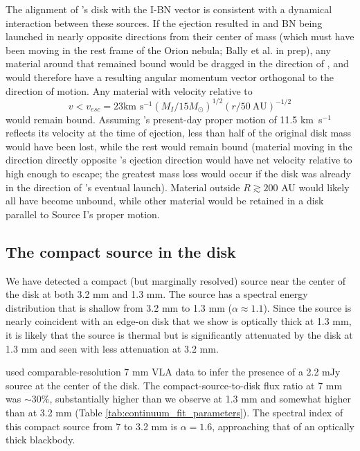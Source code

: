 \documentclass[twocolumn]{aastex61}
\newcommand{\msun}{\ensuremath{M_{\odot}}\xspace}			%
\newcommand{\kms}{\textrm{km~s}\ensuremath{^{-1}}\xspace}	%
\begin{document}
The alignment of \sourcei's disk with the I-BN vector is consistent with a
dynamical interaction between these sources.  If the ejection resulted in
\sourcei and BN being launched in nearly opposite directions from their center
of mass (which must have been moving in the rest frame of the Orion nebula; 
Bally et al. in prep), any material around \sourcei that remained bound would
be dragged in the direction of \sourcei, and would therefore have a resulting
angular momentum vector orthogonal to the direction of motion.  Any material
with
velocity relative to \sourcei 
$$v < v_{esc} = 23 \kms (M_I/15\msun)^{1/2}  (r/50~\mathrm{AU})^{-1/2}$$
would remain bound.
Assuming \sourcei's present-day proper motion of 11.5 \kms reflects its velocity
at the time of ejection, less than half of the original disk mass would
have been lost, while the rest would remain bound (material moving in the
direction directly opposite \sourcei's ejection direction would have net
velocity relative to \sourcei high enough to escape; the greatest mass
loss would occur if the disk was already in the direction of \sourcei's eventual
launch).
Material outside $R\gtrsim200$ AU would likely all have become unbound, while other
material would be retained in a disk parallel to Source I's proper motion.


\subsection{The compact source in the disk}
\label{sec:ptsrc}
We have detected a compact (but marginally resolved) source near the center of
the disk at both 3.2 mm and 1.3 mm.  The source has a spectral energy distribution
that is shallow from 3.2 mm to 1.3 mm ($\alpha\approx1.1$).  Since the source is nearly
coincident with an edge-on disk that we show is optically thick at 1.3 mm, it is
likely that the source is thermal but is significantly attenuated by the disk
at 1.3 mm and seen with less attenuation at 3.2 mm.

\citet{Reid2007a} used comparable-resolution 7 mm VLA data to infer
the presence of a 2.2 mJy source at the center of the \sourcei disk.
The compact-source-to-disk flux ratio at 7 mm was $\sim30\%$, substantially
higher than we observe at 1.3 mm and somewhat
higher than at 3.2 mm (Table \ref{tab:continuum_fit_parameters}).  
The spectral index of this compact source from 7 to 3.2 mm is $\alpha=1.6$,
approaching that of an optically
thick blackbody.
\end{document}
